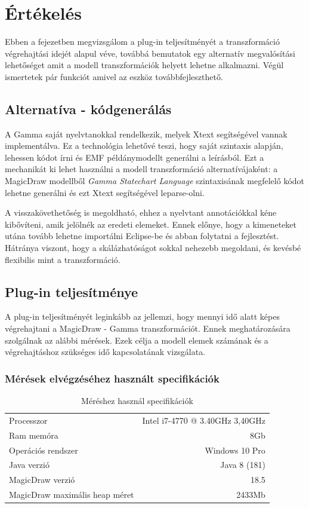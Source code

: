 \chapter{Értékelés}
\label{chap:ertekeles}
Ebben a fejezetben megvizsgálom a plug-in teljesítményét a transzformáció végrehajtási idejét alapul véve, továbbá bemutatok egy alternatív megvalósítási lehetőséget amit a modell transzformációk helyett lehetne alkalmazni. Végül ismertetek pár funkciót amivel az eszköz továbbfejleszthető.
\section{Alternatíva - kódgenerálás}
A Gamma saját nyelvtanokkal rendelkezik, melyek Xtext segítségével vannak implementálva. Ez a technológia lehetővé teszi, hogy saját szintaxis alapján, lehessen kódot írni és EMF példánymodellt generálni a leírásból. Ezt a mechanikát ki lehet használni a modell transzformáció alternatívájaként: a MagicDraw modellből \emph{Gamma Statechart Language} szintaxisának megfelelő kódot lehetne generálni és ezt Xtext segítségével leparse-olni.

A visszakövethetőség is megoldható, ehhez a nyelvtant annotációkkal kéne kibővíteni, amik jelölnék az eredeti elemeket. Ennek előnye, hogy a kimeneteket utána tovább lehetne importálni Eclipse-be és abban folytatni a fejlesztést. Hátránya viszont, hogy a skálázhatóságot sokkal nehezebb megoldani, és kevésbé flexibilis mint a transzformáció.

\section{Plug-in teljesítménye}

A plug-in teljesítményét leginkább az jellemzi, hogy mennyi idő alatt képes végrehajtani a MagicDraw - Gamma transzformációt. Ennek meghatározására szolgálnak az alábbi mérések. Ezek célja a modell elemek számának és a végrehajtáshoz szükséges idő kapcsolatának vizsgálata.

\subsection{Mérések elvégzéséhez használt specifikációk}

\begin{table}[!h]
	\footnotesize
	\centering
	\begin{tabular}{ l r }
		Processzor & Intel i7-4770 @ 3.40GHz 3,40GHz \\
		Ram memóra & 8Gb\\
		Operációs rendszer & Windows 10 Pro \\
		Java verzió & Java 8 (181) \\
		MagicDraw verzió & 18.5 \\
		MagicDraw maximális heap méret & 2433Mb
	\end{tabular}
	\caption{Méréshez használ specifikációk}
	\label{table:gepspec}
\end{table}

